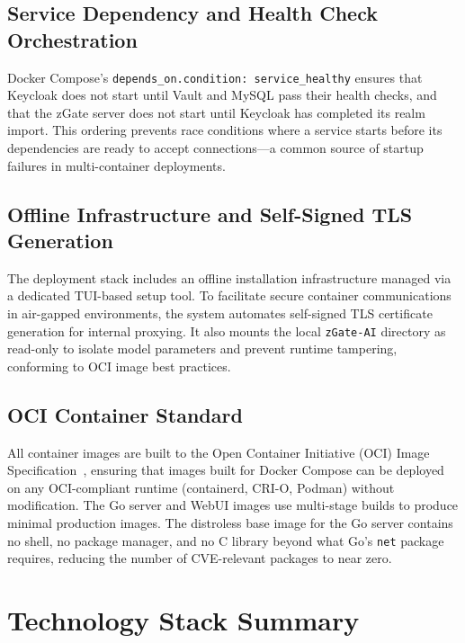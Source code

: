 \subsection{Service Dependency and Health Check Orchestration}

Docker Compose's \texttt{depends\_on.condition: service\_healthy} ensures that Keycloak does not start until Vault and MySQL pass their health checks, and that the zGate server does not start until Keycloak has completed its realm import. This ordering prevents race conditions where a service starts before its dependencies are ready to accept connections---a common source of startup failures in multi-container deployments.

\subsection{Offline Infrastructure and Self-Signed TLS Generation}

The deployment stack includes an offline installation infrastructure managed via a dedicated TUI-based setup tool. To facilitate secure container communications in air-gapped environments, the system automates self-signed TLS certificate generation for internal proxying. It also mounts the local \texttt{zGate-AI} directory as read-only to isolate model parameters and prevent runtime tampering, conforming to OCI image best practices.

\subsection{OCI Container Standard}

All container images are built to the Open Container Initiative (OCI) Image Specification~\cite{oci-spec}, ensuring that images built for Docker Compose can be deployed on any OCI-compliant runtime (containerd, CRI-O, Podman) without modification. The Go server and WebUI images use multi-stage builds to produce minimal production images. The distroless base image for the Go server contains no shell, no package manager, and no C library beyond what Go's \texttt{net} package requires, reducing the number of CVE-relevant packages to near zero.

\section{Technology Stack Summary}
\label{sec:tech-summary}

